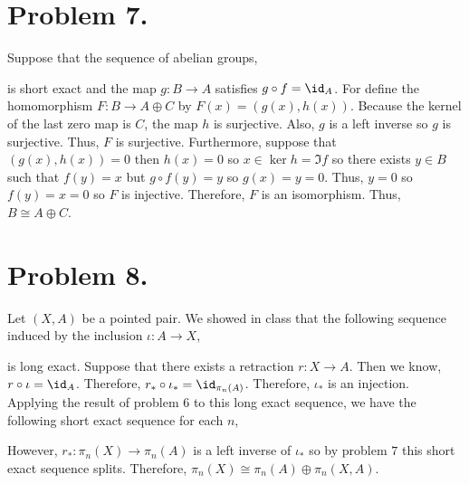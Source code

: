 \documentclass[12pt]{extarticle}
\begin{document}
\section*{Problem 7.}
Suppose that the sequence of abelian groups,
\begin{center}
\end{center}
is short exact and the map $g : B \to A$ satisfies $g \circ f = \id_A$. For define the homomorphism $F : B \to A \oplus C$ by $F(x) = (g(x), h(x))$. Because the kernel of the last zero map is $C$, the map $h$ is surjective. Also, $g$ is a left inverse so $g$ is surjective. Thus, $F$ is surjective. Furthermore, suppose that $(g(x), h(x)) = 0$ then $h(x) = 0$ so $x \in \ker{h} = \Im{f}$ so there exists $y \in B$ such that $f(y) = x$ but $g \circ f(y) = y$ so $g(x) = y = 0$. Thus, $y = 0$ so $f(y) = x = 0$ so $F$ is injective. Therefore, $F$ is an isomorphism. Thus, $B \cong A \oplus C$.  
\section*{Problem 8.}
Let $(X, A)$ be a pointed pair. We showed in class that the following sequence induced by the inclusion $\iota : A \to X$,
\begin{center}
\end{center} 
is long exact. Suppose that there exists a retraction $r : X \to A$. Then we know, $r \circ \iota = \id_A$. Therefore, $r_* \circ \iota_* = \id_{\pi_n(A)}$. Therefore, $\iota_*$ is an injection. Applying the result of problem $6$ to this long exact sequence, we have the following short exact sequence for each $n$,
\begin{center}
\end{center}
However, $r_* : \pi_n(X) \to \pi_n(A)$ is a left inverse of $\iota_*$ so by problem $7$ this short exact sequence splits. Therefore, $\pi_n(X) \cong \pi_n(A) \oplus \pi_n(X, A)$. 
\end{document}
